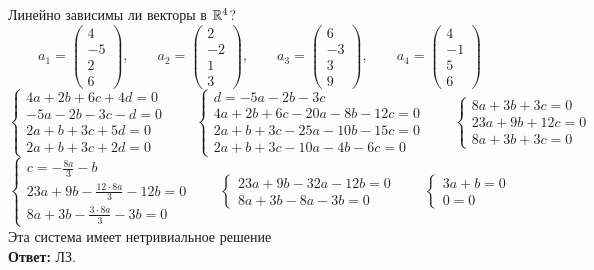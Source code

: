 Линейно зависимы ли векторы в $ \mathbb{R}^4 $?
$$ a_1 =
\begin{pmatrix}
	4 \\
    -5 \\
    2 \\
    6
\end{pmatrix}, \qquad a_2 =
\begin{pmatrix}
	2 \\
    -2 \\
    1 \\
    3
\end{pmatrix}, \qquad a_3 =
\begin{pmatrix}
	6 \\
    -3 \\
    3 \\
    9
\end{pmatrix}, \qquad a_4 =
\begin{pmatrix}
	4 \\
    -1 \\
    5 \\
    6
\end{pmatrix} $$
$$
\begin{cases}
	4a + 2b + 6c + 4d = 0 \\
    -5a - 2b - 3c - d = 0 \\
    2a + b + 3c + 5d = 0 \\
    2a + b + 3c + 2d = 0
\end{cases} \qquad
\begin{cases}
	d = -5a - 2b - 3c \\
    4a + 2b + 6c - 20a - 8b - 12c = 0 \\
    2a + b + 3c - 25a - 10b - 15c = 0 \\
    2a + b + 3c - 10a - 4b - 6c = 0
\end{cases} \qquad
\begin{cases}
	8a + 3b + 3c = 0 \\
    23a + 9b + 12c = 0 \\
    8a + 3b + 3c = 0
\end{cases} $$
$$
\begin{cases}
    c = -\frac{8a}3 - b \\
    23a + 9b - \frac{12 \cdot 8a}3 - 12b = 0 \\
    8a + 3b - \frac{3 \cdot 8a}3 - 3b = 0
\end{cases} \qquad
\begin{cases}
	23a + 9b - 32a - 12b = 0 \\
    8a + 3b - 8a - 3b = 0
\end{cases} \qquad
\begin{cases}
	3a + b = 0 \\
    0 = 0
\end{cases} $$
Эта система имеет нетривиальное решение \\
\textbf{Ответ:} ЛЗ.

